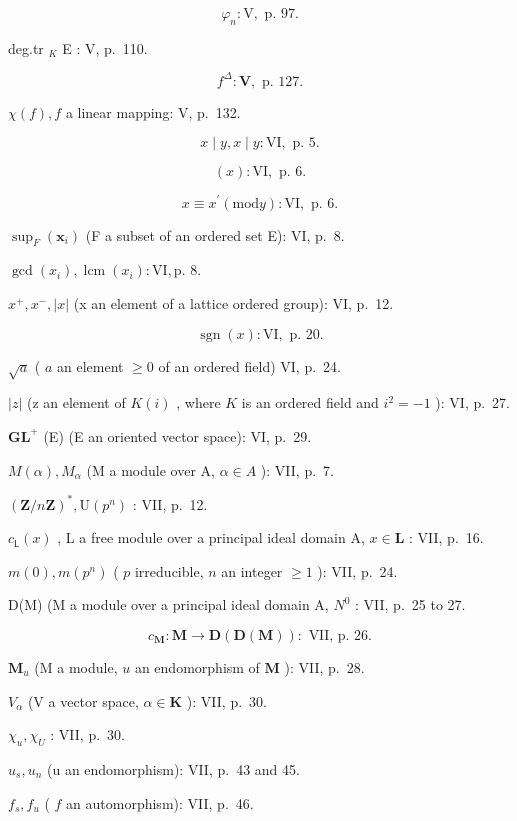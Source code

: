 \[
\varphi_ {n}: \mathrm{V}, \text { p. } 97.
\]

deg.tr \(_{K}\) E : V, p.~110.

\[
f ^ {\Delta}: \mathbf {V}, \text { p. } 127.
\]

\(\chi(f), f\) a linear mapping: V, p.~132.

\[
x \mid y, x \mid y: \mathrm{VI}, \text { p. } 5.
\]

\[
(x): \mathrm{VI}, \text { p. } 6.
\]

\[
x \equiv x ^ {\prime} (\mathrm{mod} y): \mathrm{VI}, \text { p. } 6.
\]

\(\sup_{F}(\mathbf{x}_{i})\) (F a subset of an ordered set E): VI, p.~8.

\(\gcd (x_{i}), \operatorname{lcm}(x_{i}) : \mathrm{VI}, \text{p. 8.}\)

\(x^{+}, x^{-}, |x|\) (x an element of a lattice ordered group): VI, p.~12.

\[
\operatorname{sgn} (x): \mathrm{VI}, \text { p. } 20.
\]

\(\sqrt{a}\) ( \(a\) an element \(\geqslant 0\) of an ordered field) VI, p.~24.

\(|z|\) (z an element of \(K(i)\) , where \(K\) is an ordered field and \(i^2 = -1\) ): VI, p.~27.

\(\mathbf{GL}^{+}\) (E) (E an oriented vector space): VI, p.~29.

\(M(\alpha), M_{\alpha}\) (M a module over A, \(\alpha \in A\) ): VII, p.~7.

\((\mathbf{Z} / n\mathbf{Z})^{*}, \mathrm{U}(p^{n})\) : VII, p.~12.

\(c_{\mathsf{L}}(x)\) , L a free module over a principal ideal domain A, \(x\in \mathbf{L}\) : VII, p.~16.

\(m(0), m(p^n)\) ( \(p\) irreducible, \(n\) an integer \(\geqslant 1\) ): VII, p.~24.

D(M) (M a module over a principal ideal domain A, \(N^{0}\) : VII, p.~25 to 27.

\[
c _ {\mathbf {M}}: \mathbf {M} \rightarrow \mathbf {D} (\mathbf {D} (\mathbf {M})): \text { VII,   p. } 26.
\]

\(\mathbf{M}_u\) (M a module, \(u\) an endomorphism of \(\mathbf{M}\) ): VII, p.~28.

\(V_{\alpha}\) (V a vector space, \(\alpha \in \mathbf{K}\) ): VII, p.~30.

\(\chi_{u}, \chi_{U}\) : VII, p.~30.

\(u_{s}, u_{n}\) (u an endomorphism): VII, p.~43 and 45.

\(f_{s}, f_{u}\) ( \(f\) an automorphism): VII, p.~46.

